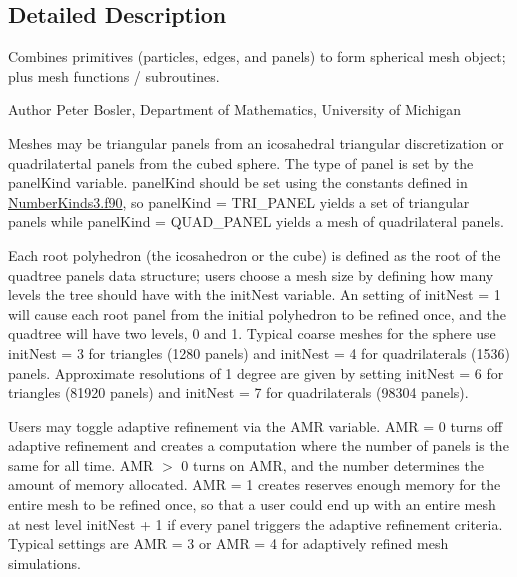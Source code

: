\subsection{Detailed Description}
Combines primitives (particles, edges, and panels) to form spherical mesh object; plus mesh functions / subroutines. 

\begin{DoxyAuthor}{Author}
Peter Bosler, Department of Mathematics, University of Michigan
\end{DoxyAuthor}
Meshes may be triangular panels from an icosahedral triangular discretization or quadrilatertal panels from the cubed sphere. The type of panel is set by the panel\+Kind variable. panel\+Kind should be set using the constants defined in \hyperlink{NumberKinds3_8f90}{Number\+Kinds3.\+f90}, so panel\+Kind = T\+R\+I\+\_\+\+P\+A\+N\+E\+L yields a set of triangular panels while panel\+Kind = Q\+U\+A\+D\+\_\+\+P\+A\+N\+E\+L yields a mesh of quadrilateral panels.

Each root polyhedron (the icosahedron or the cube) is defined as the root of the quadtree panels data structure; users choose a mesh size by defining how many levels the tree should have with the init\+Nest variable. An setting of init\+Nest = 1 will cause each root panel from the initial polyhedron to be refined once, and the quadtree will have two levels, 0 and 1. Typical coarse meshes for the sphere use init\+Nest = 3 for triangles (1280 panels) and init\+Nest = 4 for quadrilaterals (1536) panels. Approximate resolutions of 1 degree are given by setting init\+Nest = 6 for triangles (81920 panels) and init\+Nest = 7 for quadrilaterals (98304 panels).

Users may toggle adaptive refinement via the A\+M\+R variable. A\+M\+R = 0 turns off adaptive refinement and creates a computation where the number of panels is the same for all time. A\+M\+R $>$ 0 turns on A\+M\+R, and the number determines the amount of memory allocated. A\+M\+R = 1 creates reserves enough memory for the entire mesh to be refined once, so that a user could end up with an entire mesh at nest level init\+Nest + 1 if every panel triggers the adaptive refinement criteria. Typical settings are A\+M\+R = 3 or A\+M\+R = 4 for adaptively refined mesh simulations. 

